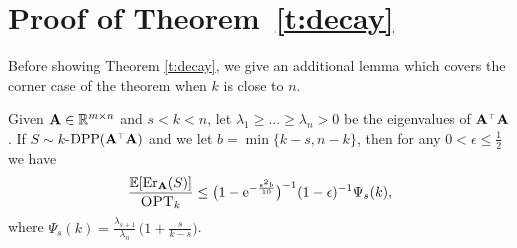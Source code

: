 \documentclass{article}
\begin{document}
\section{Proof of Theorem~\ref{t:decay}}\label{a:decay}
Before showing Theorem \ref{t:decay}, we give an additional lemma
which covers the corner case of the theorem when $k$ is close to $n$.
  \begin{lemma}\label{l:upper_conditionnum}
Given $\mathbf A\in\mathbb R^{m\times n}$ and $s< k< n$, let
$\lambda_1\geq...\geq \lambda_n>0$ be the eigenvalues of $\A^\top\A$.
If $S\sim k$-$\DPP(\A^\top\A)$ and we let $b=\min\{k-s,n-k\}$, then
for any $0<\epsilon\leq \frac12$ we have
    \begin{align*}
\frac{\mathbb E[\mathrm{Er}_\mathbf A(S)]}{{\textsc{OPT}_k}} \leq \big(1-\mathrm{e}^{-\frac{\epsilon^2b}{10}}\big)^{-1}(1-\epsilon)^{-1}\Psi_{s}(k),
    \end{align*}
    where $\Psi_s(k) = \frac{\lambda_{s+1}}{\lambda_n}\,\big(1+\frac s{k-s}\big)$.
    \end{lemma}
\end{document}
